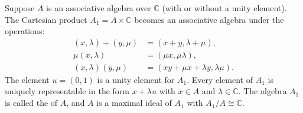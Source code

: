 Suppose $A$ is an associative algebra over $\mathbb{C}$ (with or without a unity element). The Cartesian product $A_1 = A \times \mathbb{C}$ becomes an associative algebra under the operations:
\begin{align*}
(x, \lambda) + (y, \mu) &= (x + y, \lambda + \mu), \\
\mu(x, \lambda) &= (\mu x, \mu \lambda), \\
(x, \lambda)(y, \mu) &= (xy + \mu x + \lambda y, \lambda \mu).
\end{align*}
The element $u = (0, 1)$ is a unity element for $A_1$. Every element of $A_1$ is uniquely representable in the form $x + \lambda u$ with $x \in A$ and $\lambda \in \mathbb{C}$. The algebra $A_1$ is called the  of $A$, and $A$ is a maximal ideal of $A_1$ with $A_1/A \cong \mathbb{C}$.
